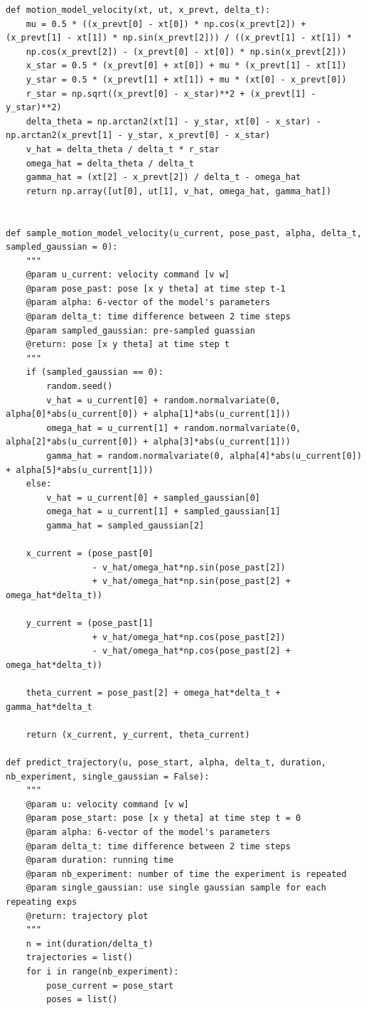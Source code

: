 \documentclass[a4paper, 12pt]{article}
\begin{document}
\begin{lstlisting}
def motion_model_velocity(xt, ut, x_prevt, delta_t):
    mu = 0.5 * ((x_prevt[0] - xt[0]) * np.cos(x_prevt[2]) + (x_prevt[1] - xt[1]) * np.sin(x_prevt[2])) / ((x_prevt[1] - xt[1]) *
    np.cos(x_prevt[2]) - (x_prevt[0] - xt[0]) * np.sin(x_prevt[2]))
    x_star = 0.5 * (x_prevt[0] + xt[0]) + mu * (x_prevt[1] - xt[1])
    y_star = 0.5 * (x_prevt[1] + xt[1]) + mu * (xt[0] - x_prevt[0])
    r_star = np.sqrt((x_prevt[0] - x_star)**2 + (x_prevt[1] - y_star)**2)
    delta_theta = np.arctan2(xt[1] - y_star, xt[0] - x_star) - np.arctan2(x_prevt[1] - y_star, x_prevt[0] - x_star)
    v_hat = delta_theta / delta_t * r_star
    omega_hat = delta_theta / delta_t
    gamma_hat = (xt[2] - x_prevt[2]) / delta_t - omega_hat
    return np.array([ut[0], ut[1], v_hat, omega_hat, gamma_hat])


def sample_motion_model_velocity(u_current, pose_past, alpha, delta_t, sampled_gaussian = 0):
    """
    @param u_current: velocity command [v w]
    @param pose_past: pose [x y theta] at time step t-1
    @param alpha: 6-vector of the model's parameters
    @param delta_t: time difference between 2 time steps
    @param sampled_gaussian: pre-sampled guassian
    @return: pose [x y theta] at time step t
    """
    if (sampled_gaussian == 0):
        random.seed()
        v_hat = u_current[0] + random.normalvariate(0, alpha[0]*abs(u_current[0]) + alpha[1]*abs(u_current[1]))
        omega_hat = u_current[1] + random.normalvariate(0, alpha[2]*abs(u_current[0]) + alpha[3]*abs(u_current[1]))
        gamma_hat = random.normalvariate(0, alpha[4]*abs(u_current[0]) + alpha[5]*abs(u_current[1]))
    else:
        v_hat = u_current[0] + sampled_gaussian[0]
        omega_hat = u_current[1] + sampled_gaussian[1]
        gamma_hat = sampled_gaussian[2]

    x_current = (pose_past[0]
                 - v_hat/omega_hat*np.sin(pose_past[2])
                 + v_hat/omega_hat*np.sin(pose_past[2] + omega_hat*delta_t))

    y_current = (pose_past[1]
                 + v_hat/omega_hat*np.cos(pose_past[2])
                 - v_hat/omega_hat*np.cos(pose_past[2] + omega_hat*delta_t))

    theta_current = pose_past[2] + omega_hat*delta_t + gamma_hat*delta_t

    return (x_current, y_current, theta_current)

def predict_trajectory(u, pose_start, alpha, delta_t, duration, nb_experiment, single_gaussian = False):
    """
    @param u: velocity command [v w]
    @param pose_start: pose [x y theta] at time step t = 0
    @param alpha: 6-vector of the model's parameters
    @param delta_t: time difference between 2 time steps
    @param duration: running time
    @param nb_experiment: number of time the experiment is repeated
    @param single_gaussian: use single gaussian sample for each repeating exps
    @return: trajectory plot
    """
    n = int(duration/delta_t)
    trajectories = list()
    for i in range(nb_experiment):
        pose_current = pose_start
        poses = list()


\end{lstlisting}
\end{document}
